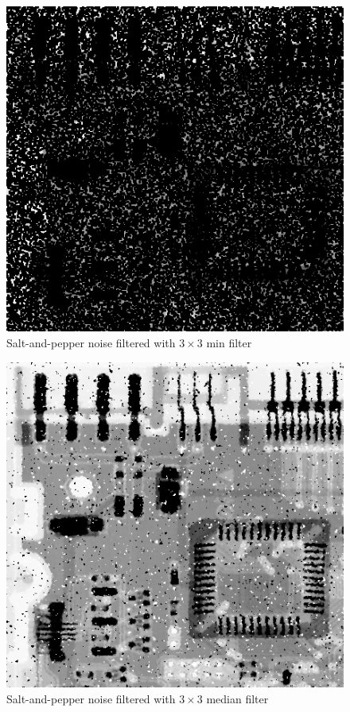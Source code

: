 \documentclass{article}
\begin{document}
\begin{figure}[H]
	\centering
	\includegraphics[width=336pt]{../result/task2/sap/sap-min.png}
	\caption{Salt-and-pepper noise filtered with $3 \times 3$ min filter}
	\label{fig:sapmin}
\end{figure}

\begin{figure}[H]
	\centering
	\includegraphics[width=336pt]{../result/task2/sap/sap-median.png}
	\caption{Salt-and-pepper noise filtered with $3 \times 3$ median filter}
	\label{fig:sapmedian}
\end{figure}
\end{document}
